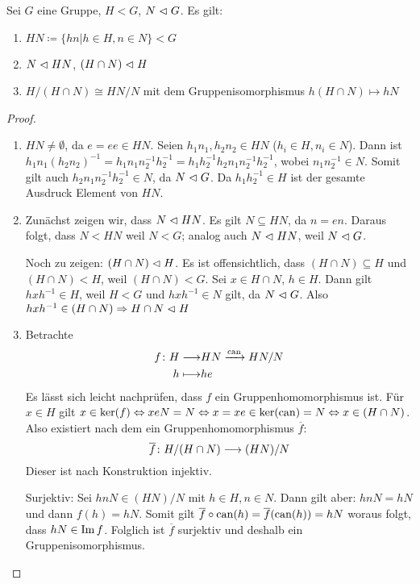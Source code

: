 \documentclass[12pt,a4paper]{scrartcl}
\begin{document}
\begin{satz}[1. Isomorphiesatz] \label{thm:iso1_g}
	Sei $G$ eine Gruppe, $H<G$, $N\vartriangleleft G$. Es gilt:
	\begin{enumerate}
		\item $HN\coloneqq\{hn|h\in H, n\in N\}<G$
		\item $N\vartriangleleft HN$, $(H\cap N)\vartriangleleft H$
		\item $H/(H\cap N) \cong HN/N$ mit dem Gruppenisomorphismus $h(H\cap N)\mapsto hN$
	\end{enumerate}
\end{satz}	
\begin{proof}
	\leavevmode
	\begin{enumerate}
		\item $HN\neq \emptyset$, da $e = ee\in HN$. Seien $h_1n_1,h_2n_2\in HN$ ($h_i\in H, n_i\in N$). Dann ist $h_1n_1(h_2n_2)^{-1} = h_1n_1n_2^{-1}h_2^{-1} = h_1h_2^{-1}h_2n_1n_2^{-1}h_2^{-1}$, wobei $n_1n_2^{-1}\in N$. Somit gilt auch $h_2n_1n_2^{-1}h_2^{-1}\in N$, da $N\vartriangleleft G$. Da $h_1h_2^{-1}\in H$ ist der gesamte Ausdruck Element von $HN$.
		\item Zunächst zeigen wir, dass $N\vartriangleleft HN$. Es gilt $N\subseteq HN$, da $n = en$. Daraus folgt, dass $N<HN$ weil $N<G$; analog auch $N\vartriangleleft HN$, weil $N\vartriangleleft G$.
		
		Noch zu zeigen: $(H\cap N)\vartriangleleft H$. Es ist offensichtlich, dass $(H\cap N)\subseteq H$ und $(H\cap N)<H$, weil $(H\cap N)<G$. Sei $x\in H\cap N$, $h\in H$. Dann gilt $hxh^{-1}\in H$, weil $H<G$ und $hxh^{-1} \in N$ gilt, da $N\vartriangleleft G$. Also $hxh^{-1}\in (H\cap N) \Rightarrow H\cap N\vartriangleleft H$
		\item Betrachte 
		\begin{align*}
			f\colon H \longrightarrow& HN \xrightarrow{\operatorname{can}} HN/N\\
			h \longmapsto &he
		\end{align*}
		Es lässt sich leicht nachprüfen, dass $f$ ein Gruppenhomomorphismus ist. Für $x\in H$ gilt $x\in \operatorname{ker}(f)\Leftrightarrow xeN = N\Leftrightarrow x = xe\in \operatorname{ker}(\operatorname{can}) = N\Leftrightarrow x\in (H\cap N)$. Also existiert nach dem  ein Gruppenhomomorphismus $\overline{f}$:
		\begin{equation*}
			\overline{f}\colon H/(H\cap N)\longrightarrow (HN)/N
		\end{equation*}
		Dieser ist nach Konstruktion injektiv.
		
		Surjektiv: Sei $hnN\in (HN)/N$ mit $h\in H, n\in N$. Dann gilt aber: $hnN = hN$ und dann $f(h)=hN$. Somit gilt $\overline{f}\circ\operatorname{can}(h) = \overline{f}(\operatorname{can}(h)) = hN$ woraus folgt, dass $hN\in \operatorname{Im} f$. Folglich ist $\overline{f}$ surjektiv und deshalb ein Gruppenisomorphismus.
  \qedhere
	\end{enumerate}
\end{proof}
\end{document}

